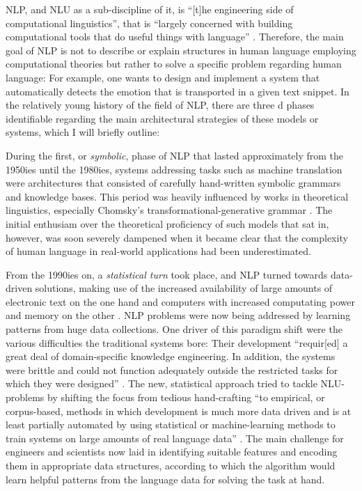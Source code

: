 

NLP, and NLU as a sub-discipline of it, is ``[t]he engineering side of computational
linguistics'', that is ``largely concerned with building computational tools that do
useful things with language'' \cite{johnson2009statistical}. Therefore, the main goal
of NLP is not to describe or explain structures in human language employing computational
theories but rather to solve a specific problem regarding human language: For example, one
wants to design and implement a system that automatically detects the emotion that is
transported in a given text snippet. In the relatively young history of the field of
NLP, there are three d phases identifiable regarding the main architectural strategies of these
models or systems, which I will briefly outline:

During the first, or \emph{symbolic}, phase of NLP that lasted approximately from the 1950ies
until the 1980ies, systems addressing tasks such as machine translation were architectures that
consisted of carefully hand-written symbolic grammars and knowledge bases. This period was heavily
influenced by works in theoretical linguistics, especially Chomsky's transformational-generative
grammar \citep{chomsky2009syntactic,chomsky2014aspects}. The initial enthusiam over the theoretical
proficiency of such models that sat in, however, was soon severely dampened when it became clear
that the complexity of human language in real-world applications had been underestimated.


From the 1990ies on, a \emph{statistical turn} took place, and NLP turned towards
data-driven solutions, making use of the increased availability of large amounts of
electronic text on the one hand and computers with increased computating power and
memory on the other \citep{liddy2001natural}.
NLP problems were now being addressed by learning patterns from huge data collections. One
driver of this paradigm shift were the various difficulties the traditional systems bore: Their
development ``requir[ed] a great deal of domain-specific knowledge engineering. In addition,
the systems were brittle and could not function adequately outside the restricted tasks for
which they were designed'' \citep[p.~13]{brill1997overview}. The new, statistical {\color{red}
approach} tried to tackle NLU-problems by shifting the focus from tedious hand-crafting ``to
empirical, or corpus-based, methods in which development is much more data driven and is at
least partially automated by using statistical or machine-learning methods to train systems
on large amounts of real language data'' \citep[p.~13]{brill1997overview}. The main challenge
for engineers and scientists now laid in identifying suitable features and encoding them in
appropriate data structures, according to which the algorithm would learn helpful patterns from
the language data for solving the task at hand.

